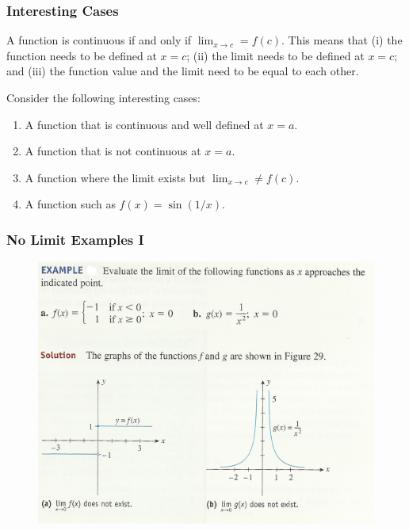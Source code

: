 \documentclass[xcolor=dvipsnames]{beamer}
\begin{document}
\begin{frame}
  \frametitle{Interesting Cases}
  A function is continuous if and only if
  $\lim_{x\rightarrow{}c}=f(c)$. This means that (i) the function
  needs to be defined at $x=c$; (ii) the limit needs to be defined at
  $x=c$; and (iii) the function value and the limit need to be equal
  to each other.

Consider the following interesting cases:
\begin{enumerate}
\item<1-> A function that is continuous and well defined at $x=a$.
\item<2-> A function that is not continuous at $x=a$.
\item<3-> A function where the limit exists but $\lim_{x\rightarrow{}c}\neq{}f(c)$.
\item<4-> A function such as $f(x)=\sin(1/x)$.
\end{enumerate}
\end{frame}


\begin{frame}
  \frametitle{No Limit Examples I}
  \begin{figure}[h]
    \includegraphics[scale=.9]{./diagrams/limita.png}
  \end{figure}
\end{frame}
\end{document}
